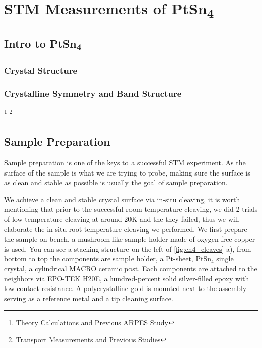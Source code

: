 \chapter{STM Measurements of PtSn\textsubscript{4}}
\section{Intro to PtSn\textsubscript{4}}
\subsection{Crystal Structure}
\subsection{Crystalline Symmetry and Band Structure} 
\footnote{Theory Calculations and Previous ARPES Study}
\footnote{Transport Measurements and Previous Studies}

\section{Sample Preparation}
\par Sample preparation is one of the keys to a successful STM experiment. As the surface of the sample is what we are trying to probe, making sure the surface is as clean and stable as possible is usually the goal of sample preparation. 

\par We achieve a clean and stable crystal surface via in-situ cleaving, it is worth mentioning that prior to the successful room-temperature cleaving, we did 2 trials of low-temperature cleaving at around 20K and the they failed, thus we will elaborate the in-situ root-temperature cleaving we performed. We first prepare the sample on bench, a mushroom like sample holder made of oxygen free copper is used. You can see a stacking structure on the left of \ref{fig:ch4_cleaves} a), from bottom to top the components are sample holder, a Pt-sheet, PtSn$_4$ single crystal, a cylindrical MACRO ceramic post. Each components are attached to the neighbors via EPO-TEK H20E, a hundred-percent solid silver-filled epoxy with low contact resistance. A polycrystalline gold is mounted next to the assembly serving as a reference metal and a tip cleaning surface. 

